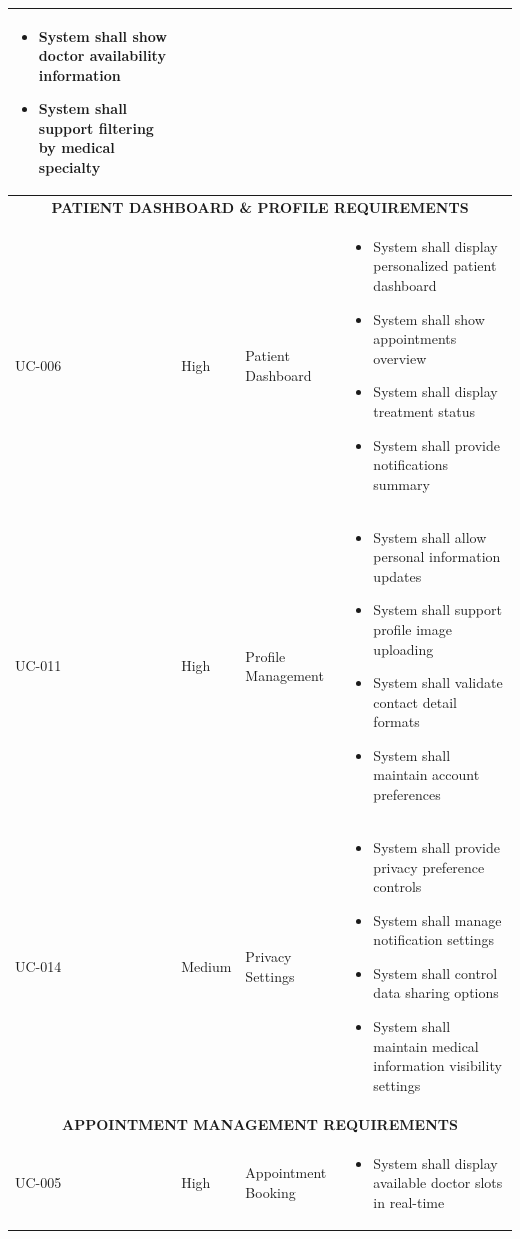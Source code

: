 \documentclass[12pt,a4paper]{article}
\begin{document}
\begin{longtable}{|p{1.2cm}|p{2.5cm}|p{3.5cm}|p{6.8cm}|}
\begin{itemize}[leftmargin=*,topsep=1pt,partopsep=0pt,parsep=0pt,itemsep=1pt]
\item System shall show doctor availability information
\item System shall support filtering by medical specialty
\end{itemize} \\
\hline
\multicolumn{4}{|c|}{\textbf{PATIENT DASHBOARD \& PROFILE REQUIREMENTS}} \\
\hline
UC-006 & High & Patient Dashboard & 
\begin{itemize}[leftmargin=*,topsep=1pt,partopsep=0pt,parsep=0pt,itemsep=1pt]
\item System shall display personalized patient dashboard
\item System shall show appointments overview
\item System shall display treatment status
\item System shall provide notifications summary
\end{itemize} \\
\hline
UC-011 & High & Profile Management & 
\begin{itemize}[leftmargin=*,topsep=1pt,partopsep=0pt,parsep=0pt,itemsep=1pt]
\item System shall allow personal information updates
\item System shall support profile image uploading
\item System shall validate contact detail formats
\item System shall maintain account preferences
\end{itemize} \\
\hline
UC-014 & Medium & Privacy Settings & 
\begin{itemize}[leftmargin=*,topsep=1pt,partopsep=0pt,parsep=0pt,itemsep=1pt]
\item System shall provide privacy preference controls
\item System shall manage notification settings
\item System shall control data sharing options
\item System shall maintain medical information visibility settings
\end{itemize} \\
\hline
\multicolumn{4}{|c|}{\textbf{APPOINTMENT MANAGEMENT REQUIREMENTS}} \\
\hline
UC-005 & High & Appointment Booking & 
\begin{itemize}[leftmargin=*,topsep=1pt,partopsep=0pt,parsep=0pt,itemsep=1pt]
\item System shall display available doctor slots in real-time

\end{itemize}
\end{longtable}
\end{document}
